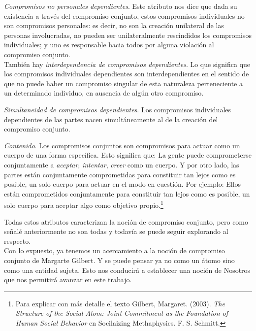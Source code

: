 \documentclass[oneside]{book}
\begin{document}
\textit{Compromisos no personales dependientes}. Este atributo nos dice que dada su existencia a través del compromiso conjunto, estos compromisos individuales no son compromisos personales: es decir, no son la creación unilateral de las personas involucradas, no pueden ser unilateralmente rescindidos los compromisos individuales; y uno es responsable hacia todos por alguna violación al compromiso conjunto.
\\

También hay \textit{interdependencia de compromisos dependientes}. Lo que significa que los compromisos individuales dependientes son interdependientes en el sentido de que no puede haber un compromiso singular de esta naturaleza perteneciente a un determinado individuo, en ausencia de algún otro compromiso.

\textit{Simultaneidad de compromisos dependientes}. Los compromisos individuales dependientes de las partes nacen simultáneamente al de la creación del compromiso conjunto.

\textit{Contenido}. Los compromisos conjuntos son compromisos para actuar como un cuerpo de una forma específica. Esto significa que: La gente puede comprometerse conjuntamente a \textit{aceptar}, \textit{intentar}, \textit{creer} como un cuerpo. Y por otro lado, las partes están conjuntamente comprometidas para constituir tan lejos como es posible, un solo cuerpo para actuar en el modo en cuestión. Por ejemplo: Ellos están comprometidos conjuntamente para constituir tan lejos como es posible, un solo cuerpo para aceptar algo como objetivo propio.\footnote{Para explicar con más detalle el texto Gilbert, Margaret. (2003). \textit{The Structure of the Social Atom: Joint Commitment as the Foundation of Human Social Behavior} en Socilaizing Methaphysics. F. S. Schmitt.}

Todas estos atributos caracterizan la noción de compromiso conjunto, pero como señalé anteriormente no son todas y todavía se puede seguir explorando al respecto.
\\

Con lo expuesto, ya tenemos un acercamiento a la noción de compromiso conjunto de Margarte Gilbert. Y se puede pensar ya no como un átomo sino como una entidad sujeta. Esto nos conducirá a establecer una noción de Nosotros que nos permitirá avanzar en este trabajo.
\end{document}
